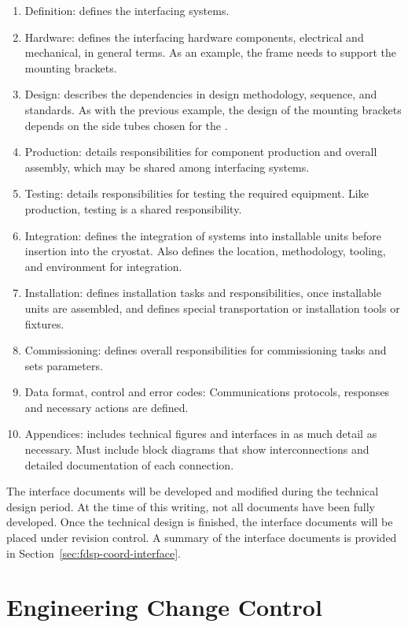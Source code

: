 \begin{enumerate}
 \item Definition: defines the interfacing systems.
 \item Hardware: defines the interfacing hardware components,
   electrical and mechanical, in general terms. As an
   example, the  frame needs to support the 
   mounting brackets.
 \item Design: describes the dependencies in design
   methodology, sequence, and standards. As with the
   previous example, the design of the  mounting
   brackets depends on the side tubes chosen for the .
 \item Production: details responsibilities for component production
   and overall assembly, which may be shared among interfacing
   systems.
 \item Testing: details responsibilities for testing the required
   equipment. Like production, testing is a shared responsibility.
 \item Integration: defines the integration of systems into installable units
   before insertion into the cryostat. 
   Also defines the location, methodology, tooling, and environment for integration.
 \item Installation: defines installation tasks and responsibilities, once
   installable units are assembled, and  defines  
   special transportation or installation tools or fixtures. 
 \item Commissioning: defines overall responsibilities for
   commissioning tasks  and sets parameters. 
 \item Data format, control and error codes: Communications protocols,
   responses and necessary actions are defined.
 \item Appendices: includes technical figures and interfaces 
   in as much detail as necessary. Must include block diagrams that
   show interconnections and detailed documentation of each connection.
\end{enumerate}


The interface documents will be developed and modified during the
technical design period. At the time of this writing, not all
documents have been fully developed. Once the technical design is
finished, the interface documents will be placed under revision
control. A summary of the interface documents is provided in
Section~\ref{sec:fdsp-coord-interface}.

\section{Engineering Change Control}
\label{sec:fdsp-change}

